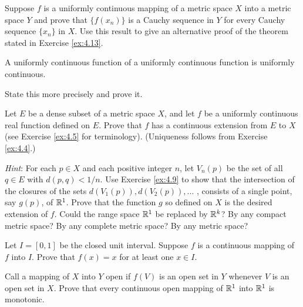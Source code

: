 \begin{myExercise}
    \label{ex:4.11}
    Suppose $f$ is a uniformly continuous mapping of a metric space $X$ into a metric space $Y$ and prove that $\{f(x_n)\}$ is a Cauchy sequence in $Y$ for every Cauchy sequence $\{x_n\}$ in $X$. 
    Use this result to give an alternative proof of the theorem stated in Exercise \ref{ex:4.13}.
\end{myExercise}


\begin{myExercise}
    \label{ex:4.12}
    A uniformly continuous function of a uniformly continuous function is uniformly continuous.
    
    State this more precisely and prove it.
\end{myExercise}


\begin{myExercise}
    \label{ex:4.13}
    Let $E$ be a dense subset of a metric space $X$, 
    and let $f$ be a uniformly continuous real function defined on $E$.
    Prove that $f$ has a continuous extension from $E$ to $X$
    (see Exercise \ref{ex:4.5} for terminology). 
    (Uniqueness follows from Exercise \ref{ex:4.4}.) 
    
    \emph{Hint}: For each $p \in X$ and each positive integer $n$, 
    let $V_n(p)$ be the set of all $q \in E$ with $d(p, q) < 1/n$. 
    Use Exercise \ref{ex:4.9} to show that the intersection of the closures of the sets $d(V_1(p)), d(V_2(p)), ...$ , 
    consists of a single point, say $g(p)$, of ${\protect\mathbb R}^1$. 
    Prove that the function $g$ so defined on $X$ is the desired extension of $f$.
    Could the range space ${\protect\mathbb R}^1$ be replaced by ${\protect\mathbb R}^k$? 
    By any compact metric space?
    By any complete metric space? 
    By any metric space?
\end{myExercise}


\begin{myExercise}
    \label{ex:4.14}
    Let $I = [0, 1]$ be the closed unit interval. 
    Suppose $f$ is a continuous mapping of $f$ into $I$. 
    Prove that $f(x) = x$ for at least one $x \in I$.
\end{myExercise}


\begin{myExercise}
    \label{ex:4.15}
    Call a mapping of $X$ into $Y$ open 
    if $f(V)$ is an open set in $Y$ whenever $V$ is an open set in $X$.
    Prove that every continuous open mapping of ${\protect\mathbb R}^1$ into ${\protect\mathbb R}^1$ is monotonic.
\end{myExercise}


